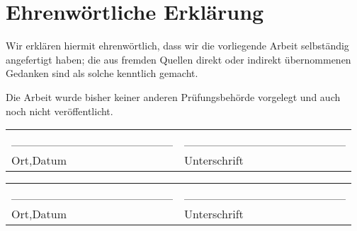 {}
\section*{Ehrenwörtliche Erklärung}

Wir erklären hiermit ehrenwörtlich, dass wir die vorliegende Arbeit selbständig angefertigt
haben; die aus fremden Quellen direkt oder indirekt übernommenen Gedanken sind als solche
kenntlich gemacht.

Die Arbeit wurde bisher keiner anderen Prüfungsbehörde vorgelegt und auch noch nicht
veröffentlicht. 

\vspace{1cm}

\begin{tabular}{p{}p{}}
	\_\_\_\_\_\_\_\_\_\_\_\_\_\_\_\_\_\_\_ & \_\_\_\_\_\_\_\_\_\_\_\_\_\_\_\_\_\_\_ \\
	Ort,Datum                              & Unterschrift
\end{tabular}

\vspace{0.5cm}

\begin{tabular}{p{}p{}}
	\_\_\_\_\_\_\_\_\_\_\_\_\_\_\_\_\_\_\_ & \_\_\_\_\_\_\_\_\_\_\_\_\_\_\_\_\_\_\_ \\
	Ort,Datum                              & Unterschrift
\end{tabular}